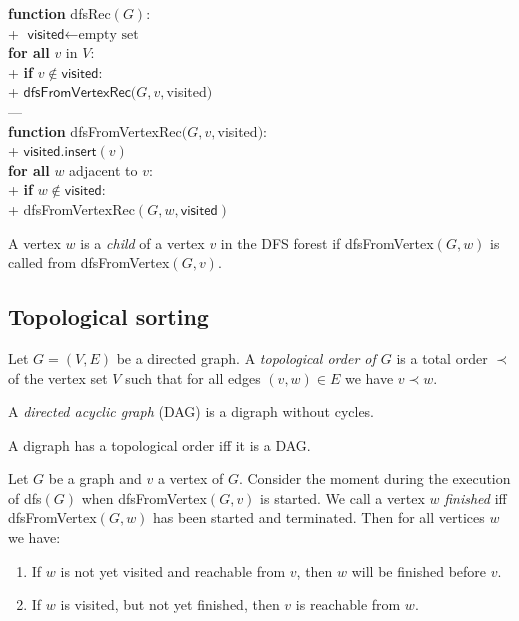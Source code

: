 \documentclass{article}
\begin{document}
\begin{pseudo}
\textbf{function} \textsf{dfsRec}$(G)$:											\\+
	$\textsf{visited}\leftarrow\text{empty set}$								\\
	\textbf{for all} $v$ in $V$:												\\+
		\textbf{if} $v\not\in\textsf{visited}$:									\\+
		$\textsf{dfsFromVertexRec}(G, v, $\textsf{visited}$)$					\\---
																				\\
\textbf{function} \textsf{dfsFromVertexRec}$(G, v, $\textsf{visited}$)$:		\\+
    $\textsf{visited}.\textsf{insert}(v)$										\\
    \textbf{for all} $w$ adjacent to $v$:										\\+
		\textbf{if} $w\not\in\textsf{visited}$:									\\+
			\textsf{dfsFromVertexRec}$(G, w, \textsf{visited})$
\end{pseudo}

\begin{definition}
	A vertex $w$ is a \emph{child} of a vertex $v$ in the DFS
	forest if \textsf{dfsFromVertex}$(G,w)$ is called from
	\textsf{dfsFromVertex}$(G,v)$.
\end{definition}

\subsection{Topological sorting}

\begin{definition}
	Let $G=(V,E)$ be a directed graph. A \emph{topological order of $G$} is a
	total order $\prec$ of the vertex set $V$ such that for all edges $(v,w)\in E$
	we have $v\prec w$.
\end{definition}

\begin{definition}
	A \emph{directed acyclic graph} (DAG) is a digraph without cycles.
\end{definition}

\begin{theorem}
	A digraph has a topological order iff it is a DAG.
\end{theorem}

\begin{lemma}
	Let $G$ be a graph and $v$ a vertex of $G$. Consider the moment
	during the execution of \textsf{dfs}$(G)$ when \textsf{dfsFromVertex}$(G,v)$
	is started. We call a vertex $w$ \emph{finished} iff \textsf{dfsFromVertex}$(G,w)$
	has been started and terminated. Then for all vertices $w$ we have:
	\begin{enumerate}
		\item If $w$ is not yet visited and reachable from $v$, then $w$ will be
		finished before $v$.
		\item If $w$ is visited, but not yet finished, then $v$ is reachable from $w$.
	\end{enumerate}
\end{lemma}
\end{document}
